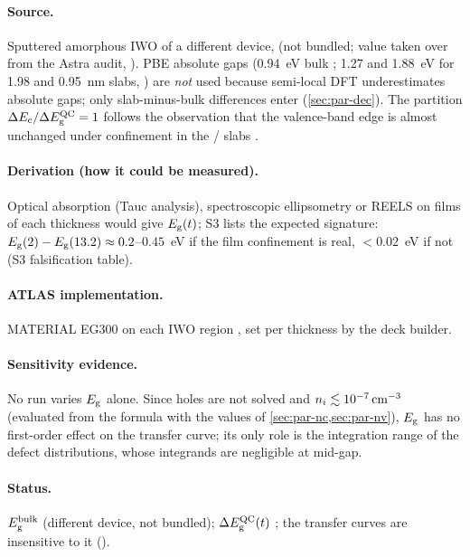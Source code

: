 \paragraph{Source.}
Sputtered amorphous IWO of a different device, \citet[Sec.~3]{Fan2021} (not bundled; value taken over
from the Astra audit, ). PBE absolute gaps (0.94~eV bulk \InO{}; 1.27 and 1.88~eV
for 1.98 and 0.95~nm slabs, \citealp[p.~21542]{Lin2022}) are \emph{not} used because semi-local DFT
underestimates absolute gaps; only slab-minus-bulk differences enter (\cref{sec:par-dec}). The partition
$\Delta E_{\mathrm{c}}/\Delta E_{\mathrm{g}}^{\mathrm{QC}} = 1$ follows the observation that the valence-band edge is almost unchanged under confinement in
the \InO/\AlO{} slabs \citep[p.~504]{Si2021}.

\paragraph{Derivation (how it could be measured).}
Optical absorption (Tauc analysis), spectroscopic ellipsometry or REELS on films of each thickness would
give $E_{\mathrm{g}}(t)$; S3 lists the expected signature: $E_{\mathrm{g}}(2)-E_{\mathrm{g}}(13.2) \approx 0.2$--$0.45$~eV if the film
confinement is real, $<0.02$~eV if not (S3 falsification table).

\paragraph{ATLAS implementation.}
MATERIAL EG300 on each IWO region \citep[p.~1338]{AtlasManual}, set per thickness by the deck builder.

\paragraph{Sensitivity evidence.}
No run varies $E_{\mathrm{g}}$ alone. Since holes are not solved and $n_i \lesssim 10^{-7}\,\mathrm{cm}^{-3}$ (evaluated from the
formula with the values of \cref{sec:par-nc,sec:par-nv}), $E_{\mathrm{g}}$ has no first-order effect on the transfer
curve; its only role is the integration range of the defect distributions, whose integrands are negligible
at mid-gap.

\paragraph{Status.}
$E_{\mathrm{g}}^{\mathrm{bulk}}$  (different device, not bundled); $\Delta E_{\mathrm{g}}^{\mathrm{QC}}(t)$
; the transfer curves are insensitive to it (\evTHEORY).

